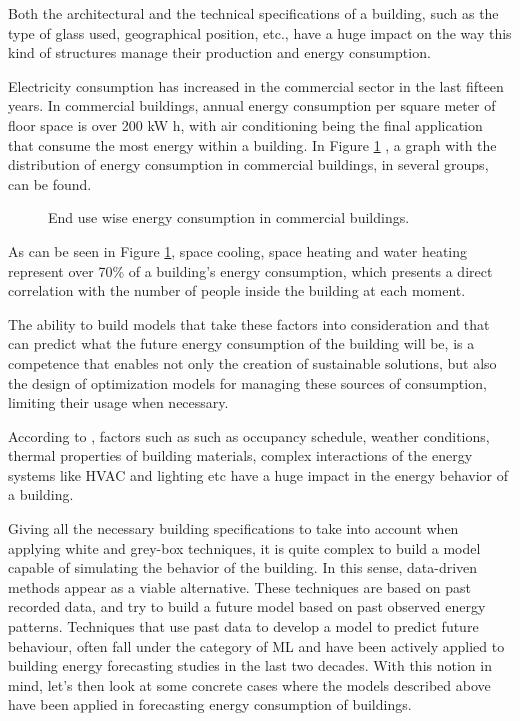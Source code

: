 Both the architectural and the technical specifications of a building, such as the type of glass used, geographical position, etc., have a huge impact on the way this kind of structures manage their production and energy consumption. 

Electricity consumption has increased in the commercial sector in the last fifteen years.  In commercial buildings, annual energy consumption per square meter of floor space is over 200 kW h, with air conditioning being the final application that consume the most energy within a building\cite{pie_1}. In Figure \ref{buildingenergy} \cite{pie_1}, a graph with the distribution of energy consumption in commercial buildings, in several groups, can be found.


\begin{figure}[h!]
    \centering
    \begin{center}
    \caption{End use wise energy consumption in commercial buildings.}
    \label{buildingenergy}
    \end{center}
\end{figure}


As can be seen in Figure \ref{buildingenergy}, space cooling, space heating and water heating represent  over 70\% of a building's energy consumption, which presents a direct correlation with  the number of people inside the building at each moment.

The ability to build models that take these factors into consideration and that can predict what the future energy consumption of the building will be, is a competence that enables not only the creation of sustainable solutions, but also the design of optimization models for managing these sources of consumption, limiting their usage when necessary.

According to \cite{reviewtsf}, factors such as such as occupancy schedule, weather conditions, thermal properties of building materials, complex interactions of the energy systems like \ac{HVAC} and lighting etc have a huge impact in the energy behavior of a building. 

Giving all the necessary building specifications to take into account when applying white and grey-box techniques, it is quite complex to build a model capable of simulating the behavior of the building. In this sense, data-driven methods appear as a viable alternative. These techniques are based on past recorded data, and try to build a future model based on past observed energy patterns. Techniques that use past data to develop a model to predict future behaviour, often fall under the category of \ac{ML} and have been actively applied to building energy forecasting studies in the last two decades. With this notion in mind, let's then look at some concrete cases where the models described above have been applied in forecasting energy consumption of buildings.

